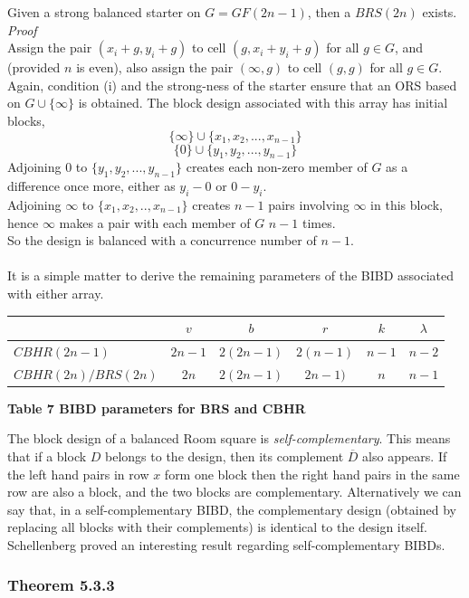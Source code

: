 \documentclass[
  12pt,
  a4paper]{book}
\begin{document}
Given a strong balanced starter on \(G=GF(2n-1)\), then a \(BRS(2n)\)
exists.\\
\emph{Proof}\\
Assign the pair \((x_i+g,y_i+g)\) to cell \((g,x_i+y_i+g)\) for all
\(g \in G\), and (provided \(n\) is even), also assign the pair
\((\infty,g)\) to cell \((g,g)\) for all \(g \in G\).\\
Again, condition (i) and the strong-ness of the starter ensure that an
ORS based on \(G \cup \{\infty\}\) is obtained. The block design
associated with this array has initial blocks,
\[\{\infty\} \cup \{x_1,x_2,...,x_{n-1}\}\]
\[\{0\} \cup \{y_1,y_2,...,y_{n-1}\}\] Adjoining 0 to
\(\{y_1,y_2,...,y_{n-1}\}\) creates each non-zero member of \(G\) as a
difference once more, either as \(y_i-0\) or \(0-y_i\).\\
Adjoining \(\infty\) to \(\{x_1,x_2,..,x_{n-1}\}\) creates \(n-1\) pairs
involving \(\infty\) in this block, hence \(\infty\) makes a pair with
each member of \(G\) \(n-1\) times.\\
So the design is balanced with a concurrence number of \(n-1\).\\
~\\
It is a simple matter to derive the remaining parameters of the BIBD
associated with either array.

\begin{longtable}[]{@{}lccccc@{}}
\toprule
& \(v\) & \(b\) & \(r\) & \(k\) & \(\lambda\)\tabularnewline
\midrule
\endhead
\(CBHR(2n-1)\) & \(2n-1\) & \(2(2n-1)\) & \(2(n-1)\) & \(n-1\) &
\(n-2\)\tabularnewline
\(CBHR(2n)/BRS(2n)\) & \(2n\) & \(2(2n-1)\) & \(2n-1)\) & \(n\) &
\(n-1\)\tabularnewline
\bottomrule
\end{longtable}

\textbf{Table 7 BIBD parameters for BRS and CBHR}

The block design of a balanced Room square is \emph{self-complementary}.
This means that if a block \(D\) belongs to the design, then its
complement \(\overline{D}\) also appears. If the left hand pairs in row
\(x\) form one block then the right hand pairs in the same row are also
a block, and the two blocks are complementary. Alternatively we can say
that, in a self-complementary BIBD, the complementary design (obtained
by replacing all blocks with their complements) is identical to the
design itself.\\
Schellenberg proved an interesting result regarding self-complementary
BIBDs.

\hypertarget{theorem-5.3.3}{%
\subsubsection{Theorem 5.3.3}\label{theorem-5.3.3}}
\end{document}
